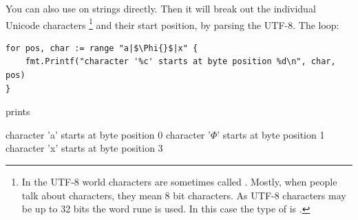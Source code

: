 You can also use  on strings directly. Then it
will break out the individual Unicode characters 
\footnote{In the UTF-8 world characters are sometimes called . 
Mostly, when people talk about
characters, they mean 8 bit characters. As UTF-8 characters may be up to 32 bits the word
rune is used. In this case the type of  is .} and their start position, by parsing the UTF-8.
The loop: 
\begin{lstlisting}
for pos, char := range "a|$\Phi{}$|x" {
    fmt.Printf("character '%c' starts at byte position %d\n", char, pos)
}
\end{lstlisting}
prints
\begin{display}
character 'a' starts at byte position 0
character '\begin{math}\Phi\end{math}' starts at byte position 1
character 'x' starts at byte position 3 
\end{display}

